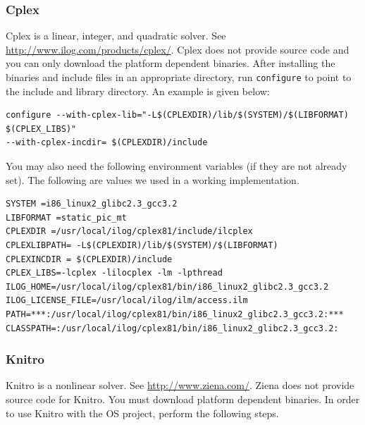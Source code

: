 \documentclass[11pt]{article}
\renewcommand{\_}{{\char"5F}}
\renewcommand{\{}{{\char"7B}}
\renewcommand{\}}{{\char"7D}}
\renewcommand{\^}{{\char"0D}}
\renewcommand{\'}{{\char"0D}}
\newif\ifknitro \knitrofalse    %
\begin{document}
\subsubsection{Cplex}

%
Cplex is a linear, integer, and quadratic solver. See \url{http://www.ilog.com/products/cplex/}.  
Cplex does not provide source code and you can only download the platform dependent binaries. 
After installing the binaries and include files in an appropriate directory, run {\tt configure} to point to the 
include and library directory. An example is given below:

\begin{verbatim}
configure --with-cplex-lib="-L$(CPLEXDIR)/lib/$(SYSTEM)/$(LIBFORMAT) $(CPLEX_LIBS)" 
--with-cplex-incdir= $(CPLEXDIR)/include
\end{verbatim}

You may also need the following environment variables (if they are not already set). The following are values we used in a working implementation.
\begin{verbatim}
SYSTEM =i86_linux2_glibc2.3_gcc3.2
LIBFORMAT =static_pic_mt
CPLEXDIR =/usr/local/ilog/cplex81/include/ilcplex
CPLEXLIBPATH= -L$(CPLEXDIR)/lib/$(SYSTEM)/$(LIBFORMAT)
CPLEXINCDIR = $(CPLEXDIR)/include
CPLEX_LIBS=-lcplex -lilocplex -lm -lpthread
ILOG_HOME=/usr/local/ilog/cplex81/bin/i86_linux2_glibc2.3_gcc3.2
ILOG_LICENSE_FILE=/usr/local/ilog/ilm/access.ilm
PATH=***:/usr/local/ilog/cplex81/bin/i86_linux2_glibc2.3_gcc3.2:***
CLASSPATH=:/usr/local/ilog/cplex81/bin/i86_linux2_glibc2.3_gcc3.2:
\end{verbatim}

\ifknitro 
\subsubsection{Knitro}

%
Knitro is a nonlinear solver. See \url{http://www.ziena.com/}.  Ziena does not provide source code for Knitro.  You must download platform dependent binaries.   In order to use Knitro with the OS project, perform the following steps.
\end{document}
